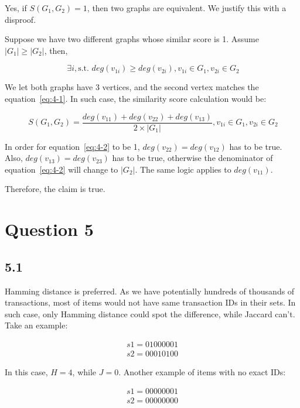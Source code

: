 \documentclass[paper=a4, fontsize=11pt]{scrartcl} %
\begin{document}
Yes, if $S(G_1, G_2)=1$, then two graphs are equivalent. We justify this with a disproof. 

Suppose we have two different graphs whose similar score is 1. Assume $|G_1| \geq |G_2|$, then,

\begin{equation}~\label{eq:4-1}
\exists i, \text{s.t. } deg(v_{1i}) \geq deg(v_{2i}), v_{1i} \in G_1, v_{2i} \in G_2
\end{equation}

We let both graphs have 3 vertices, and the second vertex matches the equation~\ref{eq:4-1}. In such case, the similarity score calculation would be:

\begin{equation}~\label{eq:4-2}
S(G_1, G_2) = \frac{deg(v_{11}) + deg(v_{22}) + deg(v_{13})}{2 \times |G_1|}, v_{1i} \in G_1, v_{2i} \in G_2
\end{equation}

In order for equation~\ref{eq:4-2} to be 1, $deg(v_{22}) = deg(v_{12})$ has to be true. Also, $deg(v_{13})=deg(v_{23})$ has to be true, otherwise the denominator of equation~\ref{eq:4-2} will change to $|G_2|$. The same logic applies to $deg(v_{11})$.

Therefore, the claim is true.

\section*{Question 5}

\subsection*{5.1}

Hamming distance is preferred. As we have potentially hundreds of thousands of transactions, most of items would not have same transaction IDs in their sets. In such case, only Hamming distance could spot the difference, while Jaccard can't. Take an example:

\begin{align}
s1=01000001\\
s2=00010100
\end{align}

In this case, $H=4$, while $J=0$. Another example of items with no exact IDs:

\begin{align}
s1=00000001\\
s2=00000000
\end{align}
\end{document}
